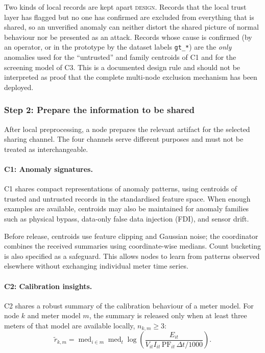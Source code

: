 \documentclass[11pt,a4paper]{article}
\newcommand{\design}{\textcolor{emorange}{\textsc{design}}}
\newcommand{\code}[1]{\texttt{#1}}
\begin{document}
Two kinds of local records are kept apart \design{}. Records that the
local trust layer has flagged but no one has confirmed are excluded from
everything that is shared, so an unverified anomaly can neither distort
the shared picture of normal behaviour nor be presented as an attack.
Records whose cause is confirmed (by an operator, or in the prototype by
the dataset labels \code{gt\_*}) are the \emph{only} anomalies used for
the ``untrusted'' and family centroids of C1 and for the screening model
of C3. This is a documented design rule and should not be interpreted as
proof that the complete multi-node exclusion mechanism has been deployed.

\subsubsection{Step 2: Prepare the information to be shared}

After local preprocessing, a node prepares the relevant artifact for
the selected sharing channel. The four channels serve different
purposes and must not be treated as interchangeable.

\paragraph{C1: Anomaly signatures.}

C1 shares compact representations of anomaly patterns, using centroids
of trusted and untrusted records in the standardised feature space.
When enough examples are available, centroids may also be maintained
for anomaly families such as physical bypass, data-only false data
injection (FDI), and sensor drift.

Before release, centroids use feature clipping and Gaussian noise;
the coordinator combines the received summaries using coordinate-wise
medians. Count bucketing is also specified as a safeguard. This allows
nodes to learn from patterns observed elsewhere without exchanging
individual meter time series.

\paragraph{C2: Calibration insights.}

C2 shares a robust summary of the calibration behaviour of a meter
model. For node $k$ and meter model $m$, the summary is released only
when at least three meters of that model are available locally,
$n_{k,m}\geq 3$:
\begin{equation}
\widetilde r_{k,m}
=
\operatorname{med}_{i\in m}
\operatorname{med}_{t}
\log\!\left(
\frac{E_{it}}
{V_{it} I_{it}\,\mathrm{PF}_{it}\,\Delta t/1000}
\right).
\label{eq:protocol-calibration-local}
\end{equation}
\end{document}
